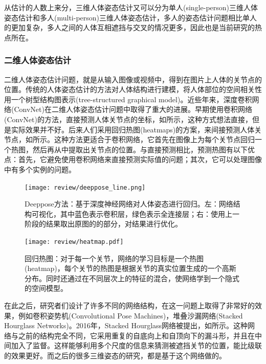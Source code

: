 从估计的人数上来分，三维人体姿态估计又可以分为单人(single-person)三维人体姿态估计和多人(multi-person)三维人体姿态估计，多人的姿态估计问题相比单人的更加复杂，多人之间的人体互相遮挡与交叉的情况更多，因此也是当前研究的热点所在。

\subsubsection{二维人体姿态估计}
二维人体姿态估计问题，就是从输入图像或视频中，得到在图片上人体的关节点的位置。传统的人体姿态估计的方法对人体结构进行建模，将人体部位的空间相关性用一个树型结构图表示(tree-structured graphical model)\cite{eichner20122d}。近些年来，深度卷积网络(ConvNet)在二维人体姿态估计问题中取得了重大的进展。早期使用卷积网络(ConvNet)的方法，直接预测人体关节点的坐标\cite{toshev2014deep}，如所示，这种方式想法直接，但是实际效果并不好。后来人们采用回归热图(heatmaps)\cite{pfister2015flowing}的方案，来间接预测人体关节点，如所示。这种方法更适合于卷积网络，它首先在图像上为每个关节点回归一个热图，然后再从中提取出关节点的位置。与直接预测相比，预测热图有以下优点：首先，它避免使用卷积网络来直接预测实际值的问题；其次，它可以处理图像中有多个实例的问题。
\begin{figure}[ht]
    \texttt{[image: review/deeppose\_line.png]}
    \caption{Deeppose方法\cite{toshev2014deep}：基于深度神经网络对人体姿态进行回归。左：网络结构可视化，其中蓝色表示卷积层，绿色表示全连接层；右：使用上一阶段的结果取出原图的的部分，对结果进行优化。}\label{fig:deeppose}
\end{figure}

\begin{figure}[ht]
    \texttt{[image: review/heatmap.pdf]}
    \caption{回归热图\cite{pfister2015flowing}：对于每一个关节，网络的学习目标是一个热图(heatmap)，每个关节的热图是根据关节的真实位置生成的一个高斯分布。同时还通过在不同层次上的特征的混合，使网络学到一个隐式的空间模型。}\label{fig:heatmap}
\end{figure}

在此之后，研究者们设计了许多不同的网络结构，在这一问题上取得了非常好的效果，例如卷积姿势机(Convolutional Pose Machines)，堆叠沙漏网络(Stacked Hourglass Networks)\cite{newell2016stacked}。2016年，Stacked Hourglass网络\cite{newell2016stacked}被提出，如所示。这种网络与之前的结构完全不同，它采用重复的自底向上和自顶向下的漏斗形，并且在中间加入了监督。这样能够利用多个尺度的信息来猜测被遮挡关节的位置，能比级联的效果更好。而之后的很多三维姿态的研究，都是基于这个网络做的。

